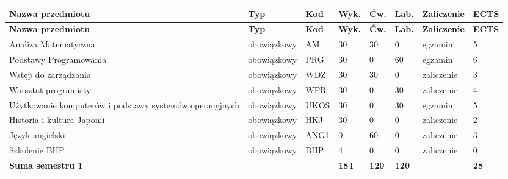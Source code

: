 \documentclass[12pt,a4paper]{article}
\newcommand{\thdrule}{\noalign{\global\setlength{\extrarowheight}{0pt}}}
\newcommand{\thdend}{\noalign{\global\setlength{\extrarowheight}{4pt}}}
\begin{document}
{\scriptsize
\begin{longtable}{m{5.0cm}m{1.9cm}m{0.75cm}m{0.85cm}m{0.85cm}m{0.85cm}m{1.45cm}m{0.9cm}}
\thdrule\toprule
\rowcolor{pjatkRed}
{\color{white}\footnotesize\textbf{\vphantom{Ag}Nazwa przedmiotu}} & {\color{white}\footnotesize\textbf{\vphantom{Ag}Typ}} & {\color{white}\footnotesize\textbf{\vphantom{Ag}Kod}} & {\color{white}\footnotesize\textbf{\vphantom{Ag}Wyk.}} & {\color{white}\footnotesize\textbf{\vphantom{Ag}Ćw.}} & {\color{white}\footnotesize\textbf{\vphantom{Ag}Lab.}} & {\color{white}\footnotesize\textbf{\vphantom{Ag}Zaliczenie}} & {\color{white}\footnotesize\textbf{\vphantom{Ag}ECTS}} \\
\midrule\thdend
\endfirsthead
\thdrule\toprule
\rowcolor{pjatkRed}
{\color{white}\footnotesize\textbf{\vphantom{Ag}Nazwa przedmiotu}} & {\color{white}\footnotesize\textbf{\vphantom{Ag}Typ}} & {\color{white}\footnotesize\textbf{\vphantom{Ag}Kod}} & {\color{white}\footnotesize\textbf{\vphantom{Ag}Wyk.}} & {\color{white}\footnotesize\textbf{\vphantom{Ag}Ćw.}} & {\color{white}\footnotesize\textbf{\vphantom{Ag}Lab.}} & {\color{white}\footnotesize\textbf{\vphantom{Ag}Zaliczenie}} & {\color{white}\footnotesize\textbf{\vphantom{Ag}ECTS}} \\
\midrule\thdend
\endhead
\rowcolor{tableRowLight} Analiza Matematyczna & {\scriptsize obowiązkowy} & AM & 30 & 30 & 0 & {\scriptsize egzamin} & 5 \\
\rowcolor{tableRowAlt} Podstawy Programowania & {\scriptsize obowiązkowy} & PRG & 30 & 0 & 60 & {\scriptsize egzamin} & 6 \\
\rowcolor{tableRowLight} Wstęp do zarządzania & {\scriptsize obowiązkowy} & WDZ & 30 & 30 & 0 & {\scriptsize zaliczenie} & 3 \\
\rowcolor{tableRowAlt} Warsztat programisty & {\scriptsize obowiązkowy} & WPR & 30 & 0 & 30 & {\scriptsize zaliczenie} & 4 \\
\rowcolor{tableRowLight} Użytkowanie komputerów i podstawy systemów operacyjnych & {\scriptsize obowiązkowy} & UKOS & 30 & 0 & 30 & {\scriptsize egzamin} & 5 \\
\rowcolor{tableRowAlt} Historia i kultura Japonii & {\scriptsize obowiązkowy} & HKJ & 30 & 0 & 0 & {\scriptsize zaliczenie} & 2 \\
\rowcolor{tableRowLight} Język angielski & {\scriptsize obowiązkowy} & ANG1 & 0 & 60 & 0 & {\scriptsize zaliczenie} & 3 \\
\rowcolor{tableRowAlt} Szkolenie BHP & {\scriptsize obowiązkowy} & BHP & 4 & 0 & 0 & {\scriptsize zaliczenie} & 0 \\
\midrule[\heavyrulewidth]
\rowcolor{tableSummary} \textbf{Suma semestru 1} & & & \textbf{184} & \textbf{120} & \textbf{120} & & \textbf{28} \\
\bottomrule
\end{longtable}}
\end{document}

